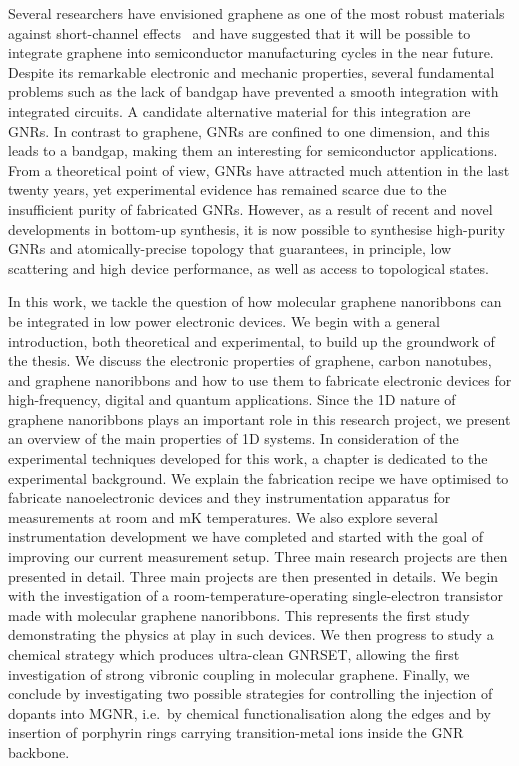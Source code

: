 Several researchers have envisioned graphene as one of the most robust materials against short-channel effects~\cite{neumaier2019integrating, chaudhry2004controlling, xie2012review, feijoo2016short,schwierz2010graphene, thiele2010modeling} and have suggested that it will be possible to integrate graphene into semiconductor manufacturing cycles in the near future. Despite its remarkable electronic and mechanic properties, several fundamental problems such as the lack of bandgap have prevented a smooth integration with integrated circuits. A candidate alternative material for this integration are \glspl{GNR}. In contrast to graphene, \glspl{GNR} are confined to one dimension, and this leads to a bandgap, making them an interesting   for semiconductor applications. From a theoretical point of view, \glspl{GNR} have attracted
much attention in the last twenty years, yet experimental evidence has remained
scarce due to the insufficient purity of fabricated GNRs. However, as a result of recent and novel developments in bottom-up synthesis, it is now possible to synthesise high-purity GNRs and atomically-precise topology that guarantees, in principle, low scattering and high device performance, as well as access to topological states.

In this work, we tackle the question of how molecular graphene nanoribbons can be integrated in low power electronic devices. We begin with a general introduction, both theoretical and experimental, to build up the groundwork of the thesis. We discuss the electronic properties of graphene, carbon nanotubes, and graphene nanoribbons and how to use them to fabricate electronic devices for high-frequency, digital and quantum applications. Since the 1D nature of graphene nanoribbons plays an important role in this research project, we present an overview of the main properties of 1D systems. In consideration
of the experimental techniques developed for this work, a chapter is dedicated to
the experimental background. We explain the fabrication recipe we have optimised to fabricate nanoelectronic devices and they instrumentation apparatus for measurements at room and \si{\milli\kelvin} temperatures. We also explore several instrumentation development we have completed and started with the goal of improving our current measurement setup. Three main research projects are then presented in detail.
Three main projects are then presented in details. We begin with the investigation of a room-temperature-operating single-electron transistor made with molecular graphene nanoribbons. This represents the first study demonstrating the physics at play in such devices. We then progress to study a chemical strategy which produces ultra-clean \gls{GNRSET}, allowing the first investigation of strong vibronic coupling in molecular graphene. Finally, we conclude by investigating two possible strategies for controlling the injection of dopants into \gls{MGNR}, i.e.\ by chemical functionalisation along the edges and by insertion of porphyrin rings carrying transition-metal ions inside the \gls{GNR} backbone.
